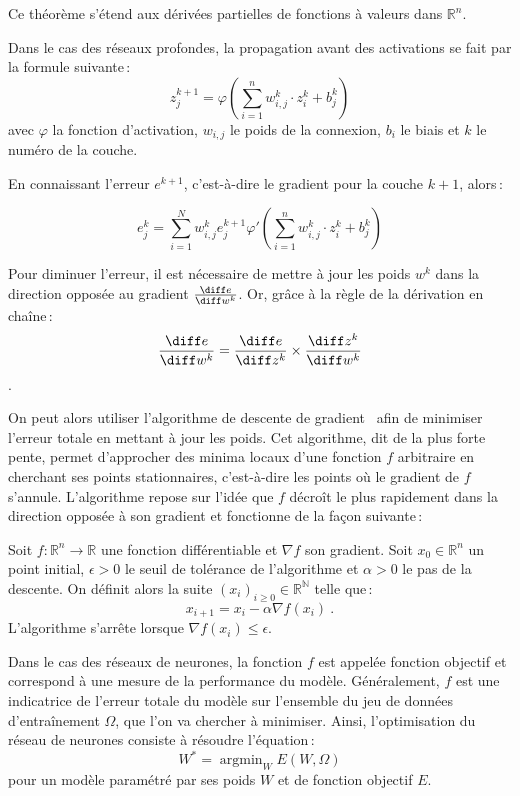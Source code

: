 Ce théorème s'étend aux dérivées partielles de fonctions à valeurs dans $\mathbb{R}^n$.

Dans le cas des réseaux profondes, la propagation avant des activations se fait par la formule suivante\,:
$$z_j^{k+1} = \varphi\left(\sum_{i=1}^n w^k_{i,j} \cdot z^k_i + b^k_j\right)$$
avec $\varphi$ la fonction d'activation, $w_{i,j}$ le poids de la connexion, $b_i$ le biais et $k$ le numéro de la couche.

En connaissant l'erreur $e^{k+1}$, c'est-à-dire le gradient pour la couche $k+1$, alors\,:

$$e^k_j = \sum_{i=1}^N w^k_{i,j} e^{k+1}_j  \varphi'\left(\sum_{i=1}^n w^k_{i,j} \cdot z^k_i + b^k_j\right)$$

Pour diminuer l'erreur, il est nécessaire de mettre à jour les poids $w^k$ dans la direction opposée au gradient $\frac{\diff e}{\diff w^k}$. Or, grâce à la règle de la dérivation en chaîne\,:
$$\frac{\diff e}{\diff w^k} = \frac{\diff e}{\diff z^k} \times \frac{\diff z^k}{\diff w^k}$$.


On peut alors utiliser l'algorithme de descente de gradient~\cite{cauchy_comptes_1847} afin de minimiser l'erreur totale en mettant à jour les poids. Cet algorithme, dit de la plus forte pente, permet d'approcher des minima locaux d'une fonction $f$ arbitraire en cherchant ses points stationnaires, c'est-à-dire les points où le gradient de $f$ s'annule. L'algorithme repose sur l'idée que $f$ décroît le plus rapidement dans la direction opposée à son gradient et fonctionne de la façon suivante\,:

\begin{theorem}
  Soit $f : \mathbb{R}^n \rightarrow \mathbb{R}$ une fonction différentiable et $\nabla f$ son gradient. Soit $x_0 \in \mathbb{R}^n$ un point initial, $\epsilon > 0$ le seuil de tolérance de l'algorithme et $\alpha > 0$ le pas de la descente. On définit alors la suite $(x_i)_{i \ge 0} \in \mathbb{R}^\mathbb{N}$ telle que\,:
  $$x_{i+1} = x_i - \alpha \nabla f(x_i)~.$$
  L'algorithme s'arrête lorsque $\nabla f(x_i) \le \epsilon$.
\end{theorem}

Dans le cas des réseaux de neurones, la fonction $f$ est appelée \og fonction objectif \fg et correspond à une mesure de la performance du modèle. Généralement, $f$ est une indicatrice de l'erreur totale du modèle sur l'ensemble du jeu de données d'entraînement $\Omega$, que l'on va chercher à minimiser. Ainsi, l'optimisation du réseau de neurones consiste à résoudre l'équation\,:
$$W^* = \operatorname{argmin}_W E(W, \Omega)$$
 pour un modèle paramétré par ses poids $W$ et de fonction objectif $E$.

